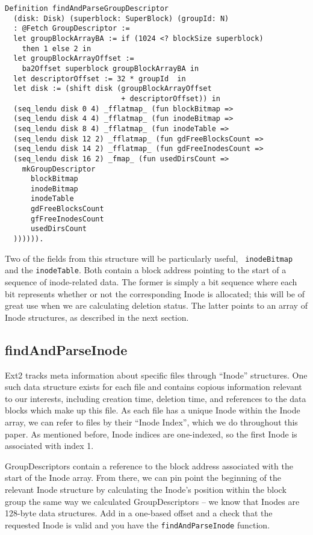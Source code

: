 \documentclass[nocopyrightspace]{sigplanconf}
\begin{document}
\begin{lstlisting}
Definition findAndParseGroupDescriptor 
  (disk: Disk) (superblock: SuperBlock) (groupId: N)
  : @Fetch GroupDescriptor :=
  let groupBlockArrayBA := if (1024 <? blockSize superblock)
    then 1 else 2 in
  let groupBlockArrayOffset := 
    ba2Offset superblock groupBlockArrayBA in
  let descriptorOffset := 32 * groupId  in
  let disk := (shift disk (groupBlockArrayOffset 
                           + descriptorOffset)) in
  (seq_lendu disk 0 4) _fflatmap_ (fun blockBitmap =>
  (seq_lendu disk 4 4) _fflatmap_ (fun inodeBitmap =>
  (seq_lendu disk 8 4) _fflatmap_ (fun inodeTable =>
  (seq_lendu disk 12 2) _fflatmap_ (fun gdFreeBlocksCount =>
  (seq_lendu disk 14 2) _fflatmap_ (fun gdFreeInodesCount =>
  (seq_lendu disk 16 2) _fmap_ (fun usedDirsCount =>
    mkGroupDescriptor
      blockBitmap
      inodeBitmap
      inodeTable
      gdFreeBlocksCount
      gfFreeInodesCount
      usedDirsCount
  )))))).
\end{lstlisting}

Two of the fields from this structure will be particularly useful, {\tt
inodeBitmap} and the {\tt inodeTable}. Both contain a block address pointing
to the start of a sequence of inode-related data. The former is simply a bit
sequence where each bit represents whether or not the corresponding Inode is
allocated; this will be of great use when we are calculating deletion status.
The latter points to an array of Inode structures, as described in the next
section.

\subsection{findAndParseInode}

Ext2 tracks meta information about specific files through ``Inode''
structures. One such data structure exists for each file and contains copious
information relevant to our interests, including creation time, deletion time,
and references to the data blocks which make up this file. As each file has a
unique Inode within the Inode array, we can refer to files by their ``Inode
Index'', which we do throughout this paper. As mentioned before, Inode indices
are one-indexed, so the first Inode is associated with index 1.

GroupDescriptors contain a reference to the block address associated with the
start of the Inode array. From there, we can pin point the beginning of the
relevant Inode structure by calculating the Inode's position within the block
group the same way we calculated GroupDescriptors -- we know that Inodes are
128-byte data structures.  Add in a one-based offset and a check that the
requested Inode is valid and you have the {\tt findAndParseInode} function.
\end{document}
